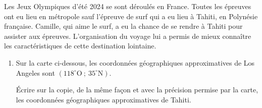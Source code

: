 \documentclass[exercice,a4]{thedocument}%
\begin{document}
%
\providecommand{\degres}{^\circ}%
Les Jeux Olympiques d'été 2024 se sont déroulés en France. Toutes les épreuves ont eu lieu en métropole sauf l'épreuve de surf qui a eu lieu à Tahiti, en Polynésie française. Camille, qui aime le surf, a eu la chance de se rendre à Tahiti pour assister aux épreuves. L'organisation du voyage lui a permis de mieux connaître les caractéristiques de cette destination lointaine.

\begin{enumerate}
\item Sur la carte ci-dessous, les coordonnées géographiques approximatives de Los Angeles sont $(118\degres\text{O}\ ;\ 35\degres\text{N})$.

Écrire sur la copie, de la même façon et avec la précision permise par la carte, les coordonnées géographiques approximatives de Tahiti.


\end{enumerate}
\end{document}
